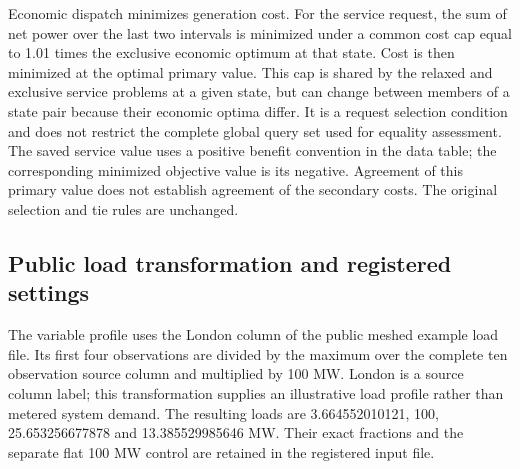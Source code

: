 Economic dispatch minimizes generation cost. For the service request,
the sum of net power over the last two intervals is minimized under a
common cost cap equal to 1.01 times the exclusive economic optimum at
that state. Cost is then minimized at the optimal primary value.
This cap is shared by the relaxed and exclusive service problems at a
given state, but can change between members of a state pair because their
economic optima differ. It is a request selection condition and does not
restrict the complete global query set used for equality assessment.
The saved service value uses a positive benefit convention in the data
table; the corresponding minimized objective value is its negative.
Agreement of this primary value does not establish agreement of the
secondary costs. The original selection and tie rules are unchanged.


\subsection{Public load transformation and registered settings}
The variable profile uses the London column of the public meshed example
load file. Its first four observations are divided by the maximum over
the complete ten observation source column and multiplied by 100 MW.
London is a source column label; this transformation supplies an illustrative
load profile rather than metered system demand. The resulting loads are
3.664552010121, 100, 25.653256677878 and 13.385529985646 MW.
Their exact fractions and the separate flat 100 MW control are retained in
the registered input file.

